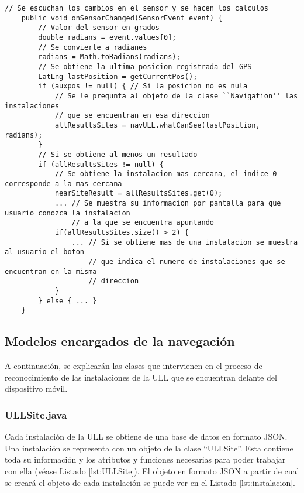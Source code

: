 \begin{minipage}{\linewidth}
\begin{lstlisting}[caption={Código que se ejecuta cada vez que se registra un cambio en el sensor que calcula la orientación.}, label={lst:orientacionL}]
    // Se escuchan los cambios en el sensor y se hacen los calculos
    public void onSensorChanged(SensorEvent event) {
        // Valor del sensor en grados
        double radians = event.values[0]; 
        // Se convierte a radianes
        radians = Math.toRadians(radians);
        // Se obtiene la ultima posicion registrada del GPS
        LatLng lastPosition = getCurrentPos();
        if (auxpos != null) { // Si la posicion no es nula
            // Se le pregunta al objeto de la clase ``Navigation'' las instalaciones 
            // que se encuentran en esa direccion
            allResultsSites = navULL.whatCanSee(lastPosition, radians);
        }
        // Si se obtiene al menos un resultado
        if (allResultsSites != null) {
            // Se obtiene la instalacion mas cercana, el indice 0 corresponde a la mas cercana
            nearSiteResult = allResultsSites.get(0);
            ... // Se muestra su informacion por pantalla para que usuario conozca la instalacion  
                // a la que se encuentra apuntando
            if(allResultsSites.size() > 2) {
                ... // Si se obtiene mas de una instalacion se muestra al usuario el boton
                    // que indica el numero de instalaciones que se encuentran en la misma
                    // direccion 
            }
        } else { ... }
    } 
\end{lstlisting}
\end{minipage}

\subsection{Modelos encargados de la navegación}

A continuación, se explicarán las clases que intervienen en el proceso de reconocimiento de las instalaciones de la ULL que se encuentran delante del dispositivo móvil.

\subsubsection{ULLSite.java}

Cada instalación de la ULL se obtiene de una base de datos en formato JSON. Una instalación se representa con un objeto de la clase ``ULLSite''. Esta contiene toda su información y los atributos y funciones necesarias para poder trabajar con ella (véase Listado \ref{lst:ULLSite}). El objeto en formato JSON a partir de cual se creará el objeto de cada instalación se puede ver en el Listado \ref{lst:instalacion}.

